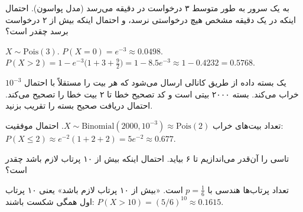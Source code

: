\begin{exercise}
به یک سرور به طور متوسط ۳ درخواست در دقیقه می‌رسد (مدل پواسون). احتمال اینکه در یک دقیقه مشخص هیچ درخواستی نرسد، و احتمال اینکه بیش از ۲ درخواست برسد چقدر است؟
\end{exercise}
\begin{solution}
$X\sim\mathrm{Pois}(3)$. $P(X=0)=e^{-3}\approx0.0498$.
$P(X>2)=1-e^{-3}\big(1+3+\frac92\big)=1-8.5e^{-3}\approx1-0.4232=0.5768$.
\end{solution}

\begin{exercise}
یک بسته داده از طریق کانالی ارسال می‌شود که هر بیت را مستقلاً با احتمال $10^{-3}$ خراب می‌کند. بسته ۲۰۰۰ بیتی است و کد تصحیح خطا تا ۲ بیت خطا را تصحیح می‌کند. احتمال دریافت صحیح بسته را تقریب بزنید.
\end{exercise}
\begin{solution}
تعداد بیت‌های خراب $X\sim\mathrm{Binomial}(2000,10^{-3})\approx\mathrm{Pois}(2)$. احتمال موفقیت:
$P(X\le2)\approx e^{-2}(1+2+2)=5e^{-2}\approx0.677$.
\end{solution}

\begin{exercise}
تاسی را آن‌قدر می‌اندازیم تا ۶ بیاید. احتمال اینکه بیش از ۱۰ پرتاب لازم باشد چقدر است؟
\end{exercise}
\begin{solution}
تعداد پرتاب‌ها هندسی با $p=\frac16$ است. «بیش از ۱۰ پرتاب لازم باشد» یعنی ۱۰ پرتاب اول همگی شکست باشند: $P(X>10)=(5/6)^{10}\approx0.1615$.
\end{solution}
